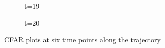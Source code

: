 \documentclass[12pt,DIV14,BCOR12mm,a4paper,footinclude=false,headinclude,parskip=half-,twoside,openright,cleardoublepage=empty,toc=index,bibliography=totoc,listof=totoc]{scrreprt}
\numberwithin{equation}{chapter}
\begin{document}
\begin{figure}[t]
\begin{subfigure}{0.45\textwidth}
            \caption{t=19}
        \end{subfigure}\hspace{0.5cm}
        \begin{subfigure}{0.45\textwidth}
            \centering
            \caption{t=20}
        \end{subfigure}
        \caption{CFAR plots at six time points along the trajectory}
        \label{CFAR plots in another part of trajectory}
\end{figure}
\end{document}
